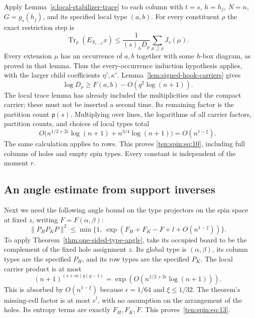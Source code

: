 Apply Lemma~\ref{s:local-stabilizer-trace} to each column with
$t=s$, $h=h_j$, $N=n$, $G=g_s(h_j)$, and its specified local type $(a,b)$.
For every constituent $\rho$ the exact restriction step is
\begin{equation}
 \operatorname{Tr}_\rho(E_{S_{s-h}}x)
 \le\frac{1}{(s)_hD_\rho}\sum_{\mu\supseteq\rho}J_s(\mu).
 \label{ten:spin:eq:11}
\end{equation}
Every extension $\mu$ has an occurrence of $a,b$ together with some
$h$-box diagram, as proved in that lemma. Thus the every-occurrence
induction hypothesis applies, with the larger child coefficients
$\eta',\kappa'$. Lemma~\ref{lem:signed-hook-carriers} gives
\begin{equation}
 \log D_\rho\ge F(a,b)-O(q^2\log(n+1)).
 \label{ten:spin:eq:12}
\end{equation}
The local trace lemma has already included the multiplicities and the
compact carrier; these must not be inserted a second time. Its remaining
factor is the partition count $\mathsf p(s)$.
Multiplying over lines, the logarithms of all carrier factors, partition
counts, and choices of local types total
\[
 O\bigl(n^{1/2+2\epsilon}\log(n+1)
                +n^{3/4}\log(n+1)\bigr)=O(n^{1-\xi}).
\]
The same calculation applies to rows. This proves
\eqref{ten:spin:eq:10}, including full columns of holes and empty
spin types. Every constant is independent of the moment $r$.

\subsection{An angle estimate from support inverses}
Next we need the following angle bound on the type projectors on the spin space at fixed \(z\), writing \(F=F(\alpha,\beta)\):
\begin{equation}
 \|P_H P_K P\|^2
 \le \min\{1,\ \exp(F_H+F_K-F+ l+O(n^{1-\xi}))\}.
 \label{ten:spin:eq:13}
\end{equation}
To apply Theorem~\ref{thm:one-sided-type-angle}, take its occupied board to be the complement of the fixed hole assignment $z$. Its global type is $(\alpha,\beta)$, its column types are the specified $P_H$, and its row types are the specified $P_K$. The local carrier product is at most
\[
 (n+1)^{(s+m)q(q-1)}=\exp(O(n^{1/2+2\epsilon}\log(n+1))).
\]
This is absorbed by $O(n^{1-\xi})$ because $\epsilon=1/64$ and $\xi\le1/32$. The theorem's missing-cell factor is at most $e^l$, with no assumption on the arrangement of the holes. Its entropy terms are exactly $F_H,F_K,F$. This proves~\eqref{ten:spin:eq:13}.

